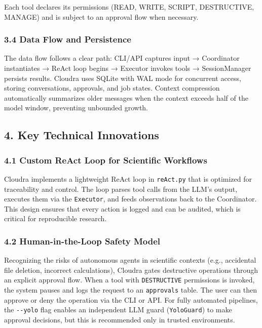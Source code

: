 Each tool declares its permissions (READ, WRITE, SCRIPT, DESTRUCTIVE,
MANAGE) and is subject to an approval flow when necessary.

\hypertarget{data-flow-and-persistence}{%
\subsubsection{3.4 Data Flow and
Persistence}\label{data-flow-and-persistence}}

The data flow follows a clear path: CLI/API captures input → Coordinator
instantiates → ReAct loop begins → Executor invokes tools →
SessionManager persists results. Cloudra uses SQLite with WAL mode for
concurrent access, storing conversations, approvals, and job states.
Context compression automatically summarizes older messages when the
context exceeds half of the model window, preventing unbounded growth.

\hypertarget{key-technical-innovations}{%
\subsection{4. Key Technical
Innovations}\label{key-technical-innovations}}

\hypertarget{custom-react-loop-for-scientific-workflows}{%
\subsubsection{4.1 Custom ReAct Loop for Scientific
Workflows}\label{custom-react-loop-for-scientific-workflows}}

Cloudra implements a lightweight ReAct loop in \texttt{reAct.py} that is
optimized for traceability and control. The loop parses tool calls from
the LLM's output, executes them via the \texttt{Executor}, and feeds
observations back to the Coordinator. This design ensures that every
action is logged and can be audited, which is critical for reproducible
research.

\hypertarget{human-in-the-loop-safety-model}{%
\subsubsection{4.2 Human-in-the-Loop Safety
Model}\label{human-in-the-loop-safety-model}}

Recognizing the risks of autonomous agents in scientific contexts (e.g.,
accidental file deletion, incorrect calculations), Cloudra gates
destructive operations through an explicit approval flow. When a tool
with \texttt{DESTRUCTIVE} permissions is invoked, the system pauses and
logs the request to an \texttt{approvals} table. The user can then
approve or deny the operation via the CLI or API. For fully automated
pipelines, the \texttt{-\/-yolo} flag enables an independent LLM guard
(\texttt{YoloGuard}) to make approval decisions, but this is recommended
only in trusted environments.

